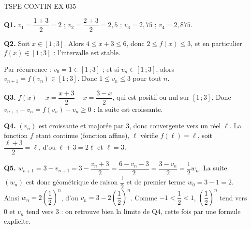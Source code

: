 \begin{corrige}{TSPE-CONTIN-EX-035}

\textbf{Q1.} $v_1 = \dfrac{1+3}{2} = 2$ ; $v_2 = \dfrac{2+3}{2} = 2{,}5$ ; $v_3 = 2{,}75$ ; $v_4 = 2{,}875$.

\textbf{Q2.} Soit $x \in [1\,;3]$. Alors $4 \leq x + 3 \leq 6$, donc $2 \leq f(x) \leq 3$, et en particulier $f(x) \in [1\,;3]$ : l'intervalle est stable.

Par récurrence : $v_0 = 1 \in [1\,;3]$ ; et si $v_n \in [1\,;3]$, alors $v_{n+1} = f(v_n) \in [1\,;3]$. Donc $1 \leq v_n \leq 3$ pour tout $n$.

\textbf{Q3.} $f(x) - x = \dfrac{x+3}{2} - x = \dfrac{3-x}{2}$, qui est positif ou nul sur $[1\,;3]$. Donc $v_{n+1} - v_n = f(v_n) - v_n \geq 0$ : la suite est croissante.

\textbf{Q4.} $(v_n)$ est croissante et majorée par $3$, donc convergente vers un réel $\ell$. La fonction $f$ etant continue (fonction affine), $\ell$ vérifie $f(\ell) = \ell$, soit $\dfrac{\ell+3}{2} = \ell$, d'ou $\ell + 3 = 2\ell$ et $\ell = 3$.

\textbf{Q5.} $w_{n+1} = 3 - v_{n+1} = 3 - \dfrac{v_n+3}{2} = \dfrac{6 - v_n - 3}{2} = \dfrac{3 - v_n}{2} = \dfrac{1}{2}w_n$. La suite $(w_n)$ est donc géométrique de raison $\dfrac12$ et de premier terme $w_0 = 3 - 1 = 2$. Ainsi $w_n = 2\left(\dfrac12\right)^n$, d'ou $v_n = 3 - 2\left(\dfrac12\right)^n$. Comme $-1 < \dfrac12 < 1$, $\left(\dfrac12\right)^n$ tend vers $0$ et $v_n$ tend vers $3$ : on retrouve bien la limite de Q4, cette fois par une formule explicite.
\end{corrige}

